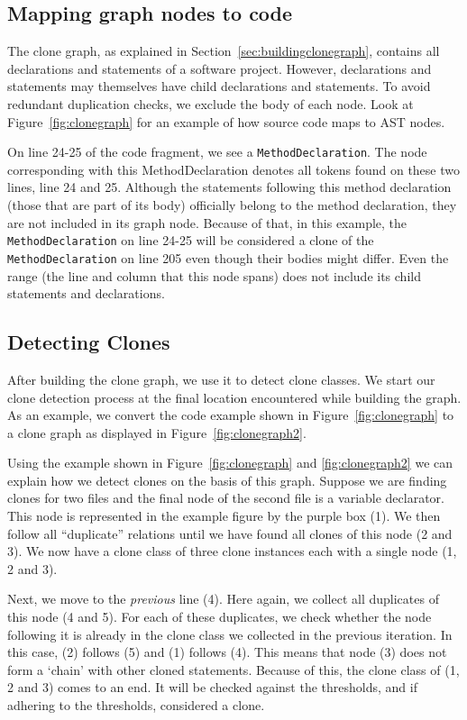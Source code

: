 \documentclass[conference]{IEEEtran}
\begin{document}
\subsection{Mapping graph nodes to code}
The clone graph, as explained in Section~\ref{sec:buildingclonegraph}, contains all declarations and statements of a software project. However, declarations and statements may themselves have child declarations and statements. To avoid redundant duplication checks, we exclude the body of each node. Look at Figure~\ref{fig:clonegraph} for an example of how source code maps to AST nodes.

On line 24-25 of the code fragment, we see a \texttt{MethodDeclaration}. The node corresponding with this MethodDeclaration denotes all tokens found on these two lines, line 24 and 25. Although the statements following this method declaration (those that are part of its body) officially belong to the method declaration, they are not included in its graph node. Because of that, in this example, the \texttt{MethodDeclaration} on line 24-25 will be considered a clone of the \texttt{MethodDeclaration} on line 205 even though their bodies might differ. Even the range (the line and column that this node spans) does not include its child statements and declarations.

\subsection{Detecting Clones} \label{sec:detectingclones}
After building the clone graph, we use it to detect clone classes. We start our clone detection process at the final location encountered while building the graph. As an example, we convert the code example shown in Figure~\ref{fig:clonegraph} to a clone graph as displayed in Figure~\ref{fig:clonegraph2}.

Using the example shown in Figure~\ref{fig:clonegraph} and \ref{fig:clonegraph2} we can explain how we detect clones on the basis of this graph. Suppose we are finding clones for two files and the final node of the second file is a variable declarator. This node is represented in the example figure by the purple box (1). We then follow all ``duplicate'' relations until we have found all clones of this node (2 and 3). We now have a clone class of three clone instances each with a single node (1, 2 and 3).

Next, we move to the \textit{previous} line (4). Here again, we collect all duplicates of this node (4 and 5). For each of these duplicates, we check whether the node following it is already in the clone class we collected in the previous iteration. In this case, (2) follows (5) and (1) follows (4). This means that node (3) does not form a `chain' with other cloned statements. Because of this, the clone class of (1, 2 and 3) comes to an end. It will be checked against the thresholds, and if adhering to the thresholds, considered a clone.
\end{document}

